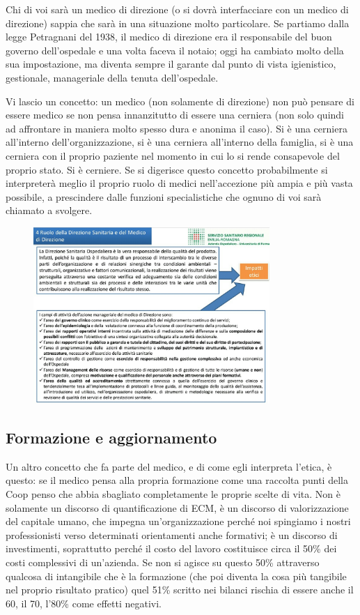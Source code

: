 Chi di voi sarà un medico di direzione (o si dovrà interfacciare con un
medico di direzione) sappia che sarà in una situazione molto
particolare. Se partiamo dalla legge Petragnani del 1938, il medico di
direzione era il responsabile del buon governo dell'ospedale e una volta
faceva il notaio; oggi ha cambiato molto della sua impostazione, ma
diventa sempre il garante dal punto di vista igienistico, gestionale,
manageriale della tenuta dell'ospedale.

Vi lascio un concetto: un medico (non solamente di direzione) non può
pensare di essere medico se non pensa innanzitutto di essere una
cerniera (non solo quindi ad affrontare in maniera molto spesso dura e
anonima il caso). Si è una cerniera all'interno dell'organizzazione, si
è una cerniera all'interno della famiglia, si è una cerniera con il
proprio paziente nel momento in cui lo si rende consapevole del proprio
stato. Si è cerniere. Se si digerisce questo concetto probabilmente si
interpreterà meglio il proprio ruolo di medici nell'accezione più ampia
e più vasta possibile, a prescindere dalle funzioni specialistiche che
ognuno di voi sarà chiamato a svolgere.

 \begin{figure}[!ht]
\centering
	\includegraphics[width=0.8\textwidth]{32/image19.jpeg}
	\end{figure}

\subsection{Formazione e aggiornamento}

Un altro concetto che fa parte del medico, e di come egli interpreta
l'etica, è questo: se il medico pensa alla propria formazione come una
raccolta punti della Coop penso che abbia sbagliato completamente le
proprie scelte di vita. Non è solamente un discorso di quantificazione
di ECM, è un discorso di valorizzazione del capitale umano, che impegna
un'organizzazione perché noi spingiamo i nostri professionisti verso
determinati orientamenti anche formativi; è un discorso di investimenti,
soprattutto perché il costo del lavoro costituisce circa il 50\% dei
costi complessivi di un'azienda. Se non si agisce su questo 50\%
attraverso qualcosa di intangibile che è la formazione (che poi diventa
la cosa più tangibile nel proprio risultato pratico) quel 51\% scritto
nei bilanci rischia di essere anche il 60, il 70, l'80\% come effetti
negativi.

